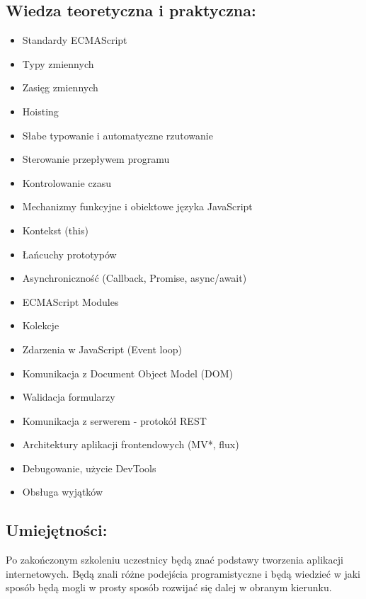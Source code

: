 \documentclass{article}[10pt]
\begin{document}
	\subsection*{Wiedza teoretyczna i praktyczna:}
\begin{adjustwidth}{1.5cm}{}
	\begin{itemize}
		\item Standardy ECMAScript
		\item 
Typy zmiennych
		\item 
Zasięg zmiennych
		\item 
Hoisting
		\item 
Słabe typowanie i automatyczne rzutowanie
		\item 
Sterowanie przepływem programu
		\item 
Kontrolowanie czasu
		\item 
Mechanizmy funkcyjne i obiektowe języka JavaScript
		\item 
Kontekst (this)
		\item 
Łańcuchy prototypów
		\item 
Asynchroniczność (Callback, Promise, async/await)
		\item 
ECMAScript Modules
		\item 
Kolekcje
		\item 
Zdarzenia w JavaScript (Event loop)
		\item 
Komunikacja z Document Object Model (DOM)
		\item 
Walidacja formularzy
		\item 
Komunikacja z serwerem - protokół REST
		\item 
Architektury aplikacji frontendowych (MV*, flux)
		\item 
Debugowanie, użycie DevTools
		\item 
Obsługa wyjątków
	\end{itemize}
\end{adjustwidth}

	\subsection*{Umiejętności:}
\begin{adjustwidth}{2cm}{}
\justifying
	
Po zakończonym szkoleniu uczestnicy będą znać podstawy tworzenia aplikacji internetowych. Będą znali różne podejścia programistyczne i będą wiedzieć w jaki sposób będą mogli w prosty sposób rozwijać się dalej w obranym kierunku.

\end{adjustwidth}
\end{document}

